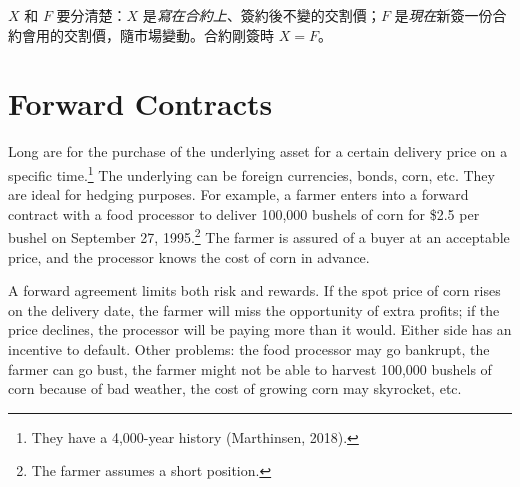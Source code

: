 \suppstart
{}

\begin{remark}
	$X$ 和 $F$ 要分清楚：$X$ 是\emph{寫在合約上}、簽約後不變的交割價；$F$ 是\emph{現在}新簽一份合約會用的交割價，隨市場變動。合約剛簽時 $X=F$。
\end{remark}
\suppend

\section{Forward Contracts}
\label{sec:forward-contracts}


Long  are for the purchase of the underlying asset for a certain delivery price on a specific time.\footnote{They have a 4,000-year history (Marthinsen, 2018).}
The underlying can be foreign currencies, bonds, corn, etc.
They are ideal for hedging purposes.
For example, a farmer enters into a forward contract with a food processor to deliver 100,000 bushels of corn for \$2.5 per bushel on September 27, 1995.\footnote{The farmer assumes a short position.}
The farmer is assured of a buyer at an acceptable price, and the processor knows the cost of corn in advance.

\suppstart
{}
\suppend

A forward agreement limits both risk and rewards.
If the spot price of corn rises on the delivery date, the farmer will miss the opportunity of extra profits; if the price declines, the processor will be paying more than it would.
Either side has an incentive to default.
Other problems: the food processor may go bankrupt, the farmer can go bust, the farmer might not be able to harvest 100,000 bushels of corn because of bad weather, the cost of growing corn may skyrocket, etc.

\suppstart
{}
\suppend

